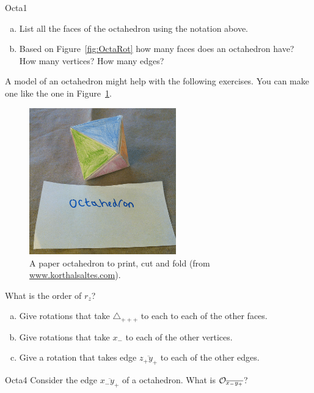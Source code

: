 \begin {exercise}{Octa1}
\begin {enumerate}[(a)]
\item List all the faces of the octahedron using the notation above.
\item Based on Figure~\ref{fig:OctaRot}  how many faces does an octahedron have? How many vertices?  How many edges?
\end{enumerate}
\end {exercise}

A model of an octahedron might help with the following exercises.  You can make one like the one in Figure~\ref{fig:OctaFold}.

\begin{figure}[ht]
\begin{center}
\includegraphics[width=2.5in]{images/OctahedronFold.png}
\caption{A paper octahedron to print, cut and fold (from \url{www.korthalsaltes.com}).}
 \label{fig:OctaFold}
\end{center}
\end{figure}

\begin{exercise}\label{exercise:actions:Octa2}
What is the order of $r_z$?
\end{exercise}

\begin{exercise}\label{exercise:actions:Octa3}
\begin {enumerate}[(a)]
\item Give rotations that take $\triangle _{+++}$ to each to each of the other faces.
\item Give rotations that take  $x_-$ to each of the other vertices.
\item Give a rotation that takes edge $\overline{z_+y_+}$ to each of the other edges.
\end{enumerate}
\end{exercise} 
\begin {exercise}{Octa4}
Consider the edge $\overline{x_-y_+}$ of a octahedron. What is ${\cal O}_{\overline{x_-y_+}}$?
\end {exercise}


